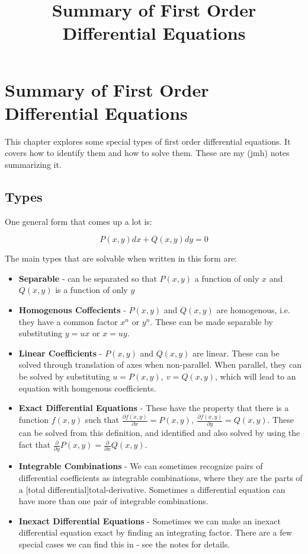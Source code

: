 \documentclass{article}
\title{Summary of First Order Differential Equations}
\begin{document}
\section{Summary of First Order Differential Equations}

This chapter explores some special types of first order differential equations. It covers how to identify them and how to solve them. These are my (jmh) notes summarizing it.

\subsection{Types}
One general form that comes up a lot is:

\[ \tag{a} P(x,y)dx + Q(x,y)dy = 0 \]

The main types that are solvable when written in this form are:

\begin{itemize}
\item \textbf{Separable} - can be separated so that $P(x,y)$ a function of only $x$ and $Q(x,y)$ is a function of only $y$
\item \textbf{Homogenous Coffecients} - $P(x,y)$ and $Q(x,y)$ are homogenous, i.e. they have a common factor $x^n$ or $y^n$. These can be made separable by substituting $y = ux$ or $x = uy$.
\item \textbf{Linear Coefficients} - $P(x,y)$ and $Q(x,y)$ are linear. These can be solved through translation of axes when non-parallel. When parallel, they can be solved by substituting $u = P(x,y),~v = Q(x,y)$, which will lead to an equation with homgenous coefficients.
\item \textbf{Exact Differential Equations} - These have the property that there is a function $f(x,y)$ such that $\frac{\partial f(x,y)}{\partial x} = P(x,y),~\frac{\partial f(x,y)}{\partial y} = Q(x,y).$ These can be solved from this definition, and identified and also solved by using the fact that $\frac{\partial}{\partial y}P(x,y) = \frac{\partial}{\partial x}Q(x,y)$.
\item \textbf{Integrable Combinations} - We can sometimes recognize pairs of differential coefficients as integrable combinations, where they are the parts of a \@[total differential]{total-derivative}. Sometimes a differential equation can have more than one pair of integrable combinations.
\item \textbf{Inexact Differential Equations} - Sometimes we can make an inexact differential equation exact by finding an integrating factor. There are a few special cases we can find this in - see the notes for details.
\end{itemize}
\end{document}
